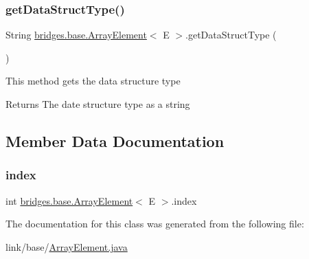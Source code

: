 \subsubsection{\texorpdfstring{get\+Data\+Struct\+Type()}{getDataStructType()}}
{\footnotesize\ttfamily String \hyperlink{classbridges_1_1base_1_1_array_element}{bridges.\+base.\+Array\+Element}$<$ E $>$.get\+Data\+Struct\+Type (\begin{DoxyParamCaption}{ }\end{DoxyParamCaption})}

This method gets the data structure type

\begin{DoxyReturn}{Returns}
The date structure type as a string 
\end{DoxyReturn}


\subsection{Member Data Documentation}
\hypertarget{classbridges_1_1base_1_1_array_element_a79c69e5046da8c297026d1e457a23182}{}\label{classbridges_1_1base_1_1_array_element_a79c69e5046da8c297026d1e457a23182} 
\subsubsection{\texorpdfstring{index}{index}}
{\footnotesize\ttfamily int \hyperlink{classbridges_1_1base_1_1_array_element}{bridges.\+base.\+Array\+Element}$<$ E $>$.index\hspace{0.3cm}{\ttfamily [static]}}



The documentation for this class was generated from the following file\+:\begin{DoxyCompactItemize}
\item 
link/base/\hyperlink{_array_element_8java}{Array\+Element.\+java}\end{DoxyCompactItemize}
